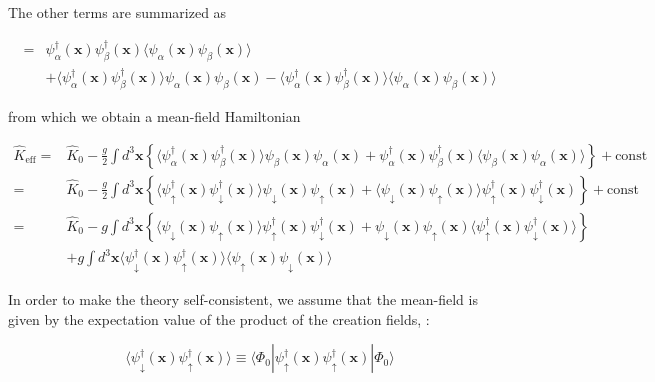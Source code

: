 The other terms are summarized as 

\[\begin{split}
 =&\psi^{\dagger}_{\alpha}(\bm{x})\psi^{\dagger}_{\beta}(\bm{x})\langle\psi_{\alpha}(\bm{x})\psi_{\beta}(\bm{x})\rangle\\
& + \langle\psi^{\dagger}_{\alpha}(\bm{x})\psi^{\dagger}_{\beta}(\bm{x})\rangle\psi_{\alpha}(\bm{x})\psi_{\beta}(\bm{x}) - \langle\psi^{\dagger}_{\alpha}(\bm{x})\psi^{\dagger}_{\beta}(\bm{x})\rangle\langle\psi_{\alpha}(\bm{x})\psi_{\beta}(\bm{x})\rangle \end{split} \]

from which we obtain a mean-field Hamiltonian 

\[\begin{split}\hat{K}_{\text{eff}} =& \hat{K}_0 - \frac{g}{2} \int d^3 \bm{x} \left\{\langle\psi^{\dagger}_{\alpha}(\bm{x})\psi^{\dagger}_{\beta}(\bm{x})\rangle\psi_{\beta}(\bm{x})\psi_{\alpha}(\bm{x}) +\psi^{\dagger}_{\alpha}(\bm{x})\psi^{\dagger}_{\beta}(\bm{x}) \langle\psi_{\beta}(\bm{x})\psi_{\alpha}(\bm{x})\rangle\right\} + \text{const}\\
=& \hat{K}_0 - \frac{g}{2} \int d^3 \bm{x} \left\{\langle\psi^{\dagger}_{\uparrow}(\bm{x})\psi^{\dagger}_{\downarrow}(\bm{x})\rangle\psi_{\downarrow}(\bm{x})\psi_{\uparrow}(\bm{x}) +\langle\psi_{\downarrow}(\bm{x})\psi_{\uparrow}(\bm{x})\rangle\psi^{\dagger}_{\uparrow}(\bm{x})\psi^{\dagger}_{\downarrow}(\bm{x}) \right\} + \text{const}\\
 =&\hat{K}_0 - g\int d^3\bm{x} \left\{\langle\psi_{\downarrow}(\bm{x})\psi_{\uparrow}(\bm{x})\rangle\psi^{\dagger}_{\uparrow}(\bm{x})\psi^{\dagger}_{\downarrow}(\bm{x}) +\psi_{\downarrow}(\bm{x})\psi_{\uparrow}(\bm{x})\langle\psi^{\dagger}_{\uparrow}(\bm{x})\psi^{\dagger}_{\downarrow}(\bm{x})\rangle \right\}\\
&+g\int d^3 \bm{x} \langle\psi^{\dagger}_{\downarrow}(\bm{x})\psi^{\dagger}_{\uparrow}(\bm{x})\rangle \langle\psi_{\uparrow}(\bm{x})\psi_{\downarrow}(\bm{x})\rangle
 \end{split}\]

In order to make the theory self-consistent, we assume that the mean-field is given by the expectation value of the product of the creation fields, :

\[\langle\psi_{\downarrow}^\dagger(\bm{x})\psi_\uparrow^\dagger(\bm{x})\rangle \equiv \langle\Phi_0|\psi_\uparrow^\dagger(\bm{x})\psi_\uparrow^\dagger(\bm{x})|\Phi_0\rangle \]

